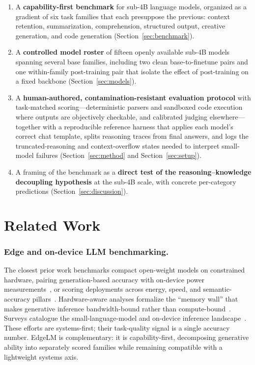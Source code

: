 \documentclass[runningheads]{llncs}
\begin{document}
\begin{enumerate}
\item A \textbf{capability-first benchmark} for sub-4B language models,
organized as a gradient of six task families that each presuppose the previous:
context retention, summarization, comprehension, structured output, creative
generation, and code generation (Section~\ref{sec:benchmark}).
\item A \textbf{controlled model roster} of fifteen openly available sub-4B
models spanning several base families, including two clean base-to-finetune
pairs and one within-family post-training pair that isolate the effect of
post-training on a fixed backbone (Section~\ref{sec:models}).
\item A \textbf{human-authored, contamination-resistant evaluation protocol}
with task-matched scoring---deterministic parsers and sandboxed code execution
where outputs are objectively checkable, and calibrated judging elsewhere---%
together with a reproducible reference harness that applies each model's correct
chat template, splits reasoning traces from final answers, and logs the
truncated-reasoning and context-overflow states needed to interpret small-model
failures (Section~\ref{sec:method} and Section~\ref{sec:setup}).
\item A framing of the benchmark as a \textbf{direct test of the
reasoning--knowledge decoupling hypothesis} at the sub-4B scale, with concrete
per-category predictions (Section~\ref{sec:discussion}).
\end{enumerate}

\section{Related Work}
\label{sec:related}

\subsubsection{Edge and on-device LLM benchmarking.}
The closest prior work benchmarks compact open-weight models on constrained
hardware, pairing generation-based accuracy with on-device power
measurements~\cite{edgebench2026}, or scoring deployments across energy,
speed, and semantic-accuracy pillars~\cite{leaf2026}. Hardware-aware analyses
formalize the ``memory wall'' that makes generative inference
bandwidth-bound rather than compute-bound~\cite{rooflinebench2026}. Surveys
catalogue the small-language-model and on-device inference
landscape~\cite{slmsurvey2024,edgeintelligence2026,ondeviceai2025}. These
efforts are systems-first; their task-quality signal is a single accuracy
number. EdgeLM is complementary: it is capability-first, decomposing generative
ability into separately scored families while remaining compatible with a
lightweight systems axis.
\end{document}
